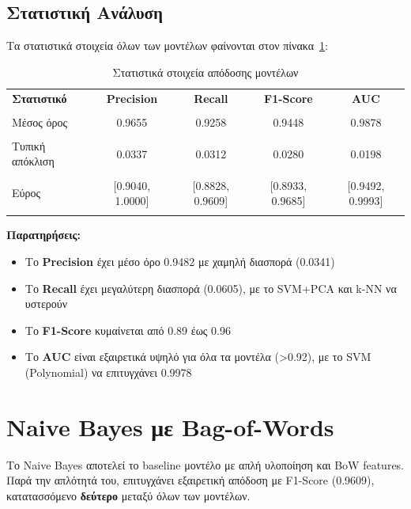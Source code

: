 \documentclass[12pt,a4paper,twoside]{book}
\begin{document}
\subsection{Στατιστική Ανάλυση}

Τα στατιστικά στοιχεία όλων των μοντέλων φαίνονται στον πίνακα~\ref{tab:stats}:

\begin{table}[H]
    \centering
    \begin{tabular}{lcccc}
        \hline
        \textbf{Στατιστικό} & \textbf{Precision} & \textbf{Recall}  & \textbf{F1-Score} & \textbf{AUC}     \\\\
        \hline
        Μέσος όρος          & 0.9655             & 0.9258           & 0.9448            & 0.9878           \\\\
        Τυπική απόκλιση     & 0.0337             & 0.0312           & 0.0280            & 0.0198           \\\\
        Εύρος               & [0.9040, 1.0000]   & [0.8828, 0.9609] & [0.8933, 0.9685]  & [0.9492, 0.9993] \\\\
        \hline
    \end{tabular}
    \caption{Στατιστικά στοιχεία απόδοσης μοντέλων}
    \label{tab:stats}
\end{table}

\textbf{Παρατηρήσεις:}
\begin{itemize}
    \item Το \textbf{Precision} έχει μέσο όρο 0.9482 με χαμηλή διασπορά (0.0341)
    \item Το \textbf{Recall} έχει μεγαλύτερη διασπορά (0.0605), με το SVM+PCA και k-NN να υστερούν
    \item Το \textbf{F1-Score} κυμαίνεται από 0.89 έως 0.96
    \item Το \textbf{AUC} είναι εξαιρετικά υψηλό για όλα τα μοντέλα (>0.92), με το SVM (Polynomial) να επιτυγχάνει 0.9978
\end{itemize}

\section{Naive Bayes με Bag-of-Words}

Το Naive Bayes αποτελεί το baseline μοντέλο με απλή υλοποίηση και BoW features. Παρά την απλότητά του, επιτυγχάνει εξαιρετική απόδοση με F1-Score (0.9609), κατατασσόμενο \textbf{δεύτερο} μεταξύ όλων των μοντέλων.
\end{document}
